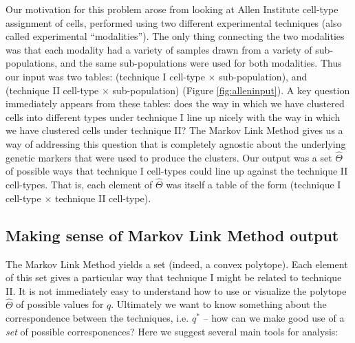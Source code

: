 Our motivation for this problem arose from looking at Allen Institute cell-type assignment of cells, performed using two different experimental techniques (also called experimental ``modalities'').  The only thing connecting the two modalities was that each modality had a variety of samples drawn from a variety of sub-populations, and the same sub-populations were used for both modalities.  Thus our input was two tables: (technique I cell-type $\times$ sub-population), and (technique II cell-type $\times$ sub-population) (Figure \ref{fig:alleninput}).  A key question immediately appears from these tables: does the way in which we have clustered cells into different types under technique I line up nicely with the way in which we have clustered cells under technique II?  The Markov Link Method gives us a way of addressing this question that is completely agnostic about the underlying genetic markers that were used to produce the clusters.  Our output was a set $\hat \Theta$ of possible ways that technique I cell-types could line up against the technique II cell-types.  That is, each element of $\hat \Theta$ was itself a table of the form (technique I cell-type $\times$ technique II cell-type).

\subsection{Making sense of Markov Link Method output}

The Markov Link Method yields a set (indeed, a convex polytope).  Each element of this set gives a particular way that technique I might be related to technique II.  It is not immediately easy to understand how to use or visualize the polytope $\hat \Theta$ of possible values for $q$.  Ultimately we want to know something about the correspondence between the techniques, i.e. $q^*$ -- how can we make good use of a \emph{set} of possible corresponences?  Here we suggest several main tools for analysis:

